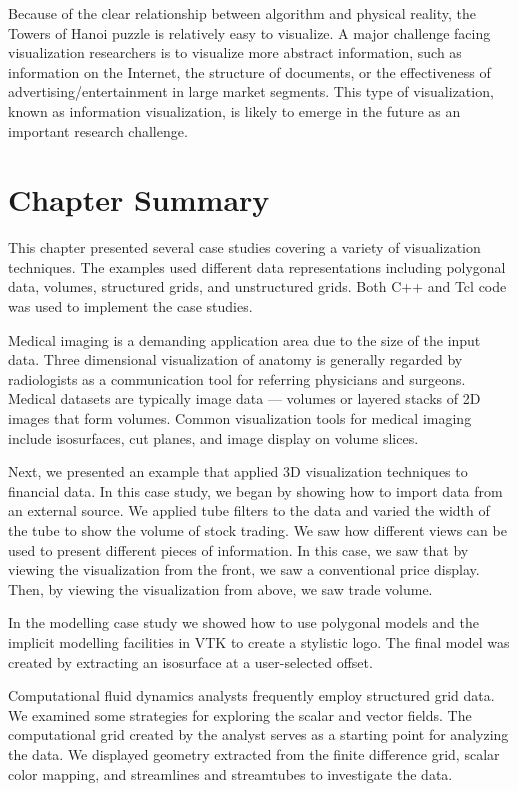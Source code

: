 Because of the clear relationship between algorithm and physical reality, the Towers of Hanoi puzzle is relatively easy to visualize. A major challenge facing visualization researchers is to visualize more abstract information, such as information on the Internet, the structure of documents, or the effectiveness of advertising/entertainment in large market segments. This type of visualization, known as information visualization, is likely to emerge in the future as an important research challenge.

\section{Chapter Summary}

This chapter presented several case studies covering a variety of visualization techniques. The examples used different data representations including polygonal data, volumes, structured grids, and unstructured grids. Both C++ and Tcl code was used to implement the case studies.

Medical imaging is a demanding application area due to the size of the input data. Three dimensional visualization of anatomy is generally regarded by radiologists as a communication tool for referring physicians and surgeons. Medical datasets are typically
image data --- volumes or layered stacks of 2D images that form volumes. Common visualization tools for medical imaging include isosurfaces, cut planes, and image display on volume slices.

Next, we presented an example that applied 3D visualization techniques to financial data. In this case study, we began by showing how to import data from an external source. We applied tube filters to the data and varied the width of the tube to show the volume of stock trading. We saw how different views can be used to present different pieces of information. In this case, we saw that by viewing the visualization from the front, we saw a conventional price display. Then, by viewing the visualization from above, we saw trade volume.

In the modelling case study we showed how to use polygonal models and the implicit modelling facilities in VTK to create a stylistic logo. The final model was created by extracting an isosurface at a user-selected offset.

Computational fluid dynamics analysts frequently employ structured grid data. We examined some strategies for exploring the scalar and vector fields. The computational grid created by the analyst serves as a starting point for analyzing the data. We displayed geometry extracted from the finite difference grid, scalar color mapping, and streamlines and streamtubes to investigate the data.

